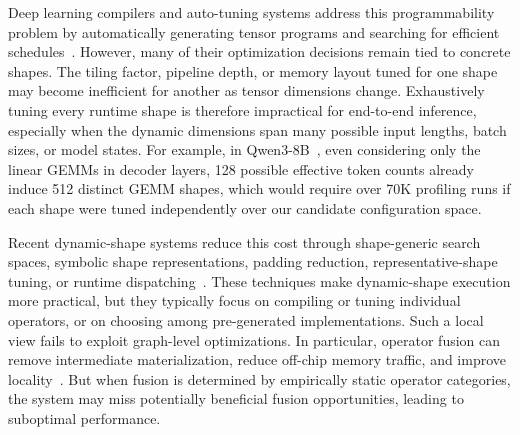 Deep learning compilers and auto-tuning systems address this programmability
problem by automatically generating tensor programs and searching for efficient
schedules~\cite{chen2018tvm,chen2018autotvm,zheng2020ansor,ansel2024pytorch}.
However, many of their optimization decisions remain tied to concrete shapes.
The tiling factor, pipeline depth, or memory layout tuned for one
shape may become inefficient for another as tensor dimensions change.
Exhaustively tuning every runtime shape is therefore impractical 
for end-to-end inference, especially when the dynamic dimensions span many possible 
input lengths, batch sizes, or model states. 
For example, in Qwen3-8B~\cite{yang2025qwen3}, even considering only the linear GEMMs in
decoder layers, 128 possible effective token counts already induce 512 distinct
GEMM shapes, which would require over 70K profiling runs if each shape were tuned 
independently over our candidate configuration space.

Recent dynamic-shape systems reduce this cost through shape-generic search
spaces, symbolic shape representations, padding reduction, representative-shape
tuning, or runtime dispatching~\cite{zheng2022dietcode,shen2021nimble,fegade2022cora,mu2024ftuner,zhou2025helix,lai2025relax}.
These techniques make dynamic-shape execution more practical, but they
typically focus on compiling or tuning individual operators, or on choosing
among pre-generated implementations. Such a local view fails to exploit graph-level optimizations. In particular, operator
fusion can remove intermediate materialization, reduce off-chip memory traffic,
and improve locality~\cite{niu2021dnnfusion,zheng2022astitch,shi2023welder,zheng2023chimera}.
But when fusion is determined by empirically static operator categories, the system 
may miss potentially beneficial fusion opportunities, leading to suboptimal performance.

